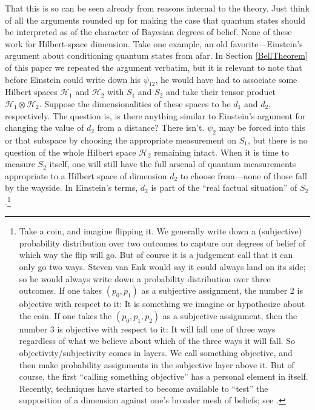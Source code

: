 \documentclass[aps,pra,superscriptaddress,10pt,tightenlines,twocolumn,nofootinbib]{revtex4}
\begin{document}
That this is so can be seen already from reasons internal to the
theory.  Just think of all the arguments rounded up for making the
case that quantum states should be interpreted as of the character of
Bayesian degrees of belief.  None of these work for Hilbert-space
dimension.  Take one example, an old favorite---Einstein's argument
about conditioning quantum states from afar.  In Section
\ref{BellTheorem} of this paper we repeated the argument verbatim, but
it is relevant to note that before Einstein could write down his
$\psi_{12}$, he would have had to associate some Hilbert spaces
${\mathcal H}_1$ and ${\mathcal H}_2$ with $S_1$ and $S_2$ and take
their tensor product ${\mathcal H}_1\otimes{\mathcal H}_2$.  Suppose
the dimensionalities of these spaces to be $d_1$ and $d_2$,
respectively.  The question is, is there anything similar to
Einstein's argument for changing the value of $d_2$ from a distance?
There isn't.  $\psi_2$ may be forced into this or that subspace by
choosing the appropriate measurement on $S_1$, but there is no
question of the whole Hilbert space ${\mathcal H}_2$ remaining intact.
When it is time to measure $S_2$ itself, one will still have the full
arsenal of quantum measurements appropriate to a Hilbert space of
dimension $d_2$ to choose from---none of those fall by the wayside.
In Einstein's terms, $d_2$ is part of the ``real factual situation''
of $S_2$.\footnote{Take a coin, and imagine flipping it. We generally
  write down a (subjective) probability distribution over two
  outcomes to capture our degrees of belief of which way the flip will
  go. But of course it is a judgement call that it can only go two
  ways. Steven van Enk would say it could always land on its side; so
  he would always write down a probability distribution over three
  outcomes.  If one takes $(p_0 , p_1 )$ as a subjective assignment,
  the number 2 is objective with respect to it: It is something we imagine
  or hypothesize about the coin. If one takes the $(p_0, p_1, p_2 )$
  as a subjective assignment, then the number 3 is objective with
  respect to it: It will fall one of three ways regardless of what we
  believe about which of the three ways it will fall. So
  objectivity/subjectivity comes in layers. We call something
  objective, and then make probability assignments in the subjective
  layer above it. But of course, the first ``calling something
  objective'' has a personal element in itself.  Recently, techniques
  have started to become available to ``test'' the supposition of a
  dimension against one's broader mesh of beliefs; see
  \cite{Brunner08,Wehner08,Wolf09}.}
\end{document}
